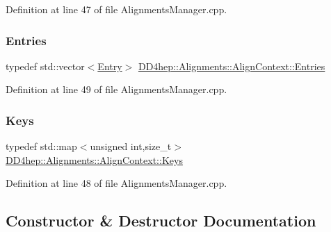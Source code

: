 Definition at line 47 of file Alignments\+Manager.\+cpp.

\hypertarget{class_d_d4hep_1_1_alignments_1_1_align_context_a1b5a088a6d88177089055193c11aa67c}{}\label{class_d_d4hep_1_1_alignments_1_1_align_context_a1b5a088a6d88177089055193c11aa67c} 
\subsubsection{\texorpdfstring{Entries}{Entries}}
{\footnotesize\ttfamily typedef std\+::vector$<$\hyperlink{struct_d_d4hep_1_1_alignments_1_1_align_context_1_1_entry}{Entry}$>$ \hyperlink{class_d_d4hep_1_1_alignments_1_1_align_context_a1b5a088a6d88177089055193c11aa67c}{D\+D4hep\+::\+Alignments\+::\+Align\+Context\+::\+Entries}}



Definition at line 49 of file Alignments\+Manager.\+cpp.

\hypertarget{class_d_d4hep_1_1_alignments_1_1_align_context_afed2b1b68f90bb0129bd51a08904332b}{}\label{class_d_d4hep_1_1_alignments_1_1_align_context_afed2b1b68f90bb0129bd51a08904332b} 
\subsubsection{\texorpdfstring{Keys}{Keys}}
{\footnotesize\ttfamily typedef std\+::map$<$unsigned int,size\+\_\+t$>$ \hyperlink{class_d_d4hep_1_1_alignments_1_1_align_context_afed2b1b68f90bb0129bd51a08904332b}{D\+D4hep\+::\+Alignments\+::\+Align\+Context\+::\+Keys}}



Definition at line 48 of file Alignments\+Manager.\+cpp.



\subsection{Constructor \& Destructor Documentation}
\hypertarget{class_d_d4hep_1_1_alignments_1_1_align_context_a0340e8218e8b1ffc12521b5d17bcdb90}{}\label{class_d_d4hep_1_1_alignments_1_1_align_context_a0340e8218e8b1ffc12521b5d17bcdb90} 

